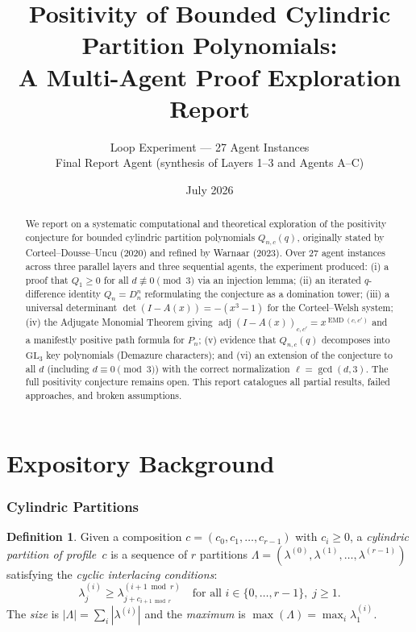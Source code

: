 \documentclass[11pt]{article}
\title{Positivity of Bounded Cylindric Partition Polynomials:\\
A Multi-Agent Proof Exploration Report}
\author{Loop Experiment --- 27 Agent Instances\\
\small Final Report Agent (synthesis of Layers 1--3 and Agents A--C)}
\date{July 2026}
\theoremstyle{definition}
\newtheorem{definition}[theorem]{Definition}
\begin{document}
\maketitle

\begin{abstract}
We report on a systematic computational and theoretical exploration of the positivity conjecture for bounded cylindric partition polynomials $Q_{n,c}(q)$, originally stated by Corteel--Dousse--Uncu (2020) and refined by Warnaar (2023). Over 27 agent instances across three parallel layers and three sequential agents, the experiment produced: (i) a proof that $Q_1 \geq 0$ for all $d \not\equiv 0 \pmod{3}$ via an injection lemma; (ii) an iterated $q$-difference identity $Q_n = D_n^n$ reformulating the conjecture as a domination tower; (iii) a universal determinant $\det(I - A(x)) = -(x^3 - 1)$ for the Corteel--Welsh system; (iv) the Adjugate Monomial Theorem giving $\operatorname{adj}(I - A(x))_{c,c'} = x^{\operatorname{EMD}(c,c')}$ and a manifestly positive path formula for $P_n$; (v) evidence that $Q_{n,c}(q)$ decomposes into $\mathrm{GL}_3$ key polynomials (Demazure characters); and (vi) an extension of the conjecture to all $d$ (including $d \equiv 0 \pmod{3}$) with the correct normalization $\ell = \gcd(d,3)$. The full positivity conjecture remains open. This report catalogues all partial results, failed approaches, and broken assumptions.
\end{abstract}

\tableofcontents
\newpage

\part{Expository Background}

\section{Cylindric Partitions}\label{sec:CP}

\begin{definition}
Given a composition $c = (c_0, c_1, \ldots, c_{r-1})$ with $c_i \geq 0$, a \emph{cylindric partition of profile~$c$} is a sequence of $r$ partitions $\Lambda = (\lambda^{(0)}, \lambda^{(1)}, \ldots, \lambda^{(r-1)})$ satisfying the \emph{cyclic interlacing conditions}:
\[
\lambda^{(i)}_j \geq \lambda^{(i+1 \bmod r)}_{j + c_{i+1 \bmod r}}
\quad \text{for all } i \in \{0, \ldots, r-1\},\; j \geq 1.
\]
The \emph{size} is $|\Lambda| = \sum_i |\lambda^{(i)}|$ and the \emph{maximum} is $\max(\Lambda) = \max_i \lambda^{(i)}_1$.
\end{definition}
\end{document}
